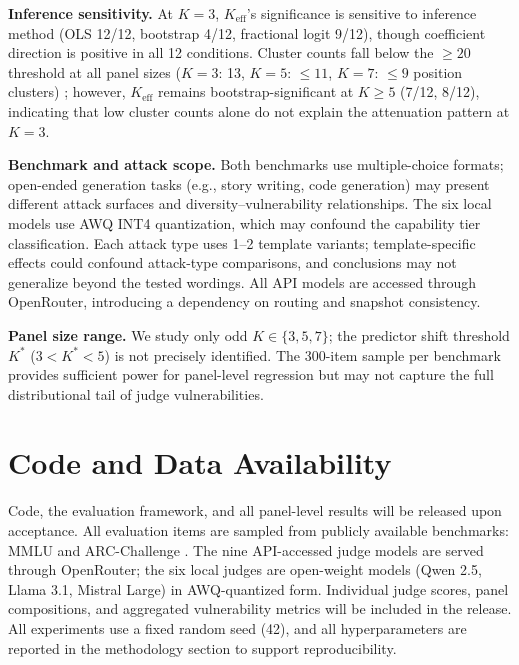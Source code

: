\documentclass[11pt]{article}
\begin{document}
\textbf{Inference sensitivity.} At $K{=}3$, $K_{\mathrm{eff}}$'s significance is sensitive to inference method (OLS 12/12, bootstrap 4/12, fractional logit 9/12), though coefficient direction is positive in all 12 conditions. Cluster counts fall below the ${\geq}20$ threshold at all panel sizes ($K{=}3$: 13, $K{=}5$: ${\leq}11$, $K{=}7$: ${\leq}9$ position clusters) \citep{cameron2008bootstrap}; however, $K_{\mathrm{eff}}$ remains bootstrap-significant at $K{\geq}5$ (7/12, 8/12), indicating that low cluster counts alone do not explain the attenuation pattern at $K{=}3$.

\textbf{Benchmark and attack scope.} Both benchmarks use multiple-choice formats; open-ended generation tasks (e.g., story writing, code generation) may present different attack surfaces and diversity--vulnerability relationships. The six local models use AWQ INT4 quantization, which may confound the capability tier classification. Each attack type uses 1--2 template variants; template-specific effects could confound attack-type comparisons, and conclusions may not generalize beyond the tested wordings. All API models are accessed through OpenRouter, introducing a dependency on routing and snapshot consistency.

\textbf{Panel size range.} We study only odd $K \in \{3,5,7\}$; the predictor shift threshold $K^*$ ($3 < K^* < 5$) is not precisely identified. The 300-item sample per benchmark provides sufficient power for panel-level regression but may not capture the full distributional tail of judge vulnerabilities.

\section*{Code and Data Availability}
Code, the evaluation framework, and all panel-level results will be released upon acceptance. All evaluation items are sampled from publicly available benchmarks: MMLU \citep{hendrycks2021mmlu} and ARC-Challenge \citep{clark2018arc}. The nine API-accessed judge models are served through OpenRouter; the six local judges are open-weight models (Qwen 2.5, Llama 3.1, Mistral Large) in AWQ-quantized form. Individual judge scores, panel compositions, and aggregated vulnerability metrics will be included in the release. All experiments use a fixed random seed (42), and all hyperparameters are reported in the methodology section to support reproducibility.





\end{document}
